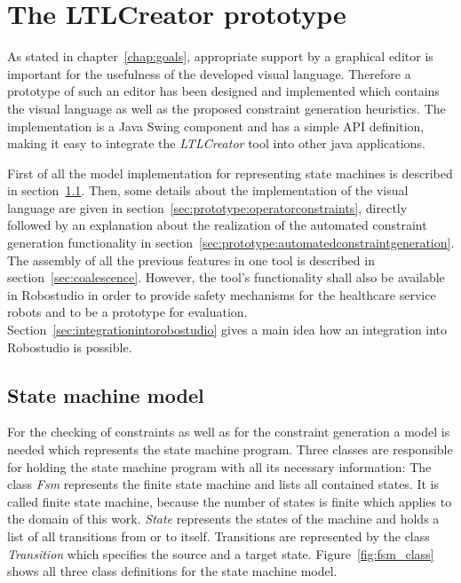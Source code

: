 \chapter{The LTLCreator prototype}
\label{chap:theltlcreatorprototype}

As stated in chapter~\ref{chap:goals}, appropriate support by a graphical editor is important for the usefulness of the developed visual language. Therefore a prototype of such an editor has been designed and implemented which contains the visual language as well as the proposed constraint generation heuristics. The implementation is a Java Swing component and has a simple API definition, making it easy to integrate the \emph{LTLCreator} tool into other java applications.

First of all the model implementation for representing state machines is described in section~\ref{sec:statemachinemodel}. Then, some details about the implementation of the visual language are given in section~\ref{sec:prototype:operatorconstraints}, directly followed by an explanation about the realization of the automated constraint generation functionality in section~\ref{sec:prototype:automatedconstraintgeneration}.
The assembly of all the previous features in one tool is described in section~\ref{sec:coalescence}. However, the tool's functionality shall also be available in Robostudio in order to provide safety mechanisms for the healthcare service robots and to be a prototype for evaluation. Section~\ref{sec:integrationintorobostudio} gives a main idea how an integration into Robostudio is possible. 


\section{State machine model}
\label{sec:statemachinemodel}

For the checking of constraints as well as for the constraint generation a model is needed which represents the state machine program. Three classes are responsible for holding the state machine program with all its necessary information: The class \emph{Fsm} represents the finite state machine and lists all contained states. It is called finite state machine, because the number of states is finite which applies to the domain of this work. \emph{State} represents the states of the machine and holds a list of all transitions from or to itself. Transitions are represented by the class \emph{Transition} which specifies the source and a target state. Figure~\ref{fig:fsm_class} shows all three class definitions for the state machine model.

